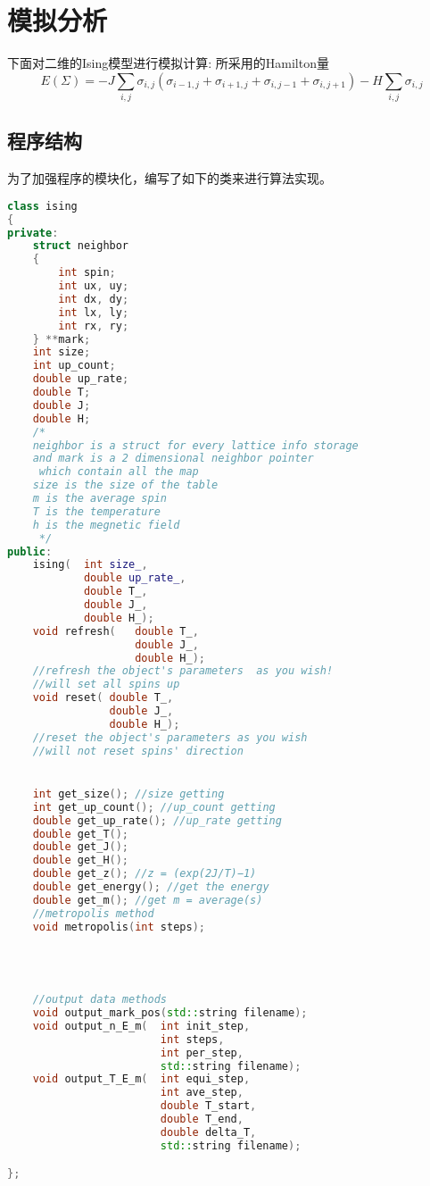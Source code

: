 \documentclass[12pt]{article} %
\begin{document}
\section{模拟分析}
下面对二维的Ising模型进行模拟计算:
所采用的Hamilton量
\begin{equation}
\label{equ: Hamilton_2D}
E(\Sigma) = -J\sum_{i,j}\sigma_{i,j}(\sigma_{i-1,j}+\sigma_{i+1,j}+\sigma_{i,j-1}+\sigma_{i,j+1}) - H\sum_{i,j}\sigma_{i,j}
\end{equation}

\subsection{程序结构} %
\label{sec:程序结构_}
为了加强程序的模块化，编写了如下的类来进行算法实现。
\begin{lstlisting}[language=C++]
class ising
{
private:
    struct neighbor
    {
        int spin;
        int ux, uy;
        int dx, dy;
        int lx, ly;
        int rx, ry;
    } **mark;
    int size;
    int up_count;
    double up_rate;
    double T;
    double J;
    double H;
    /*
    neighbor is a struct for every lattice info storage
    and mark is a 2 dimensional neighbor pointer
     which contain all the map
    size is the size of the table
    m is the average spin
    T is the temperature
    h is the megnetic field
     */
public:
    ising(  int size_,
            double up_rate_,
            double T_,
            double J_,
            double H_);
    void refresh(   double T_,
                    double J_,
                    double H_);
    //refresh the object's parameters  as you wish!
    //will set all spins up
    void reset( double T_,
                double J_,
                double H_);
    //reset the object's parameters as you wish
    //will not reset spins' direction


    int get_size(); //size getting
    int get_up_count(); //up_count getting
    double get_up_rate(); //up_rate getting
    double get_T();
    double get_J();
    double get_H();
    double get_z(); //z = (exp(2J/T)−1)
    double get_energy(); //get the energy
    double get_m(); //get m = average(s)
    //metropolis method
    void metropolis(int steps);




    //output data methods
    void output_mark_pos(std::string filename);
    void output_n_E_m(  int init_step,
                        int steps,
                        int per_step,
                        std::string filename);
    void output_T_E_m(  int equi_step,
                        int ave_step,
                        double T_start,
                        double T_end,
                        double delta_T,
                        std::string filename);

};
\end{lstlisting}
\end{document}
